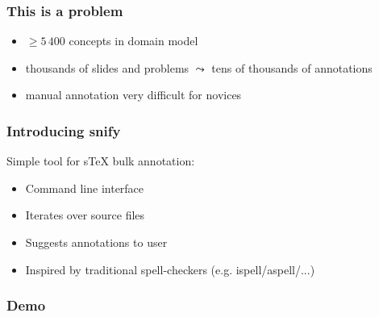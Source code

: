 \documentclass[aspectratio=169]{beamer}
\begin{document}
\begin{frame}
    \frametitle{This is a problem}
    \begin{itemize}
        \item $\ge 5\,400$ concepts in domain model
        \item thousands of slides and problems $\leadsto$ tens of thousands of annotations
        \item manual annotation very difficult for novices
    \end{itemize}
\end{frame}

\begin{frame}
    \frametitle{Introducing snify}
    Simple tool for sTeX bulk annotation:
    \begin{itemize}
        \item Command line interface
        \item Iterates over source files
        \item Suggests annotations to user
        \item Inspired by traditional spell-checkers (e.g. ispell/aspell/...)
    \end{itemize}
\end{frame}

\begin{frame}
    \frametitle{Demo}
\end{frame}
\end{document}
